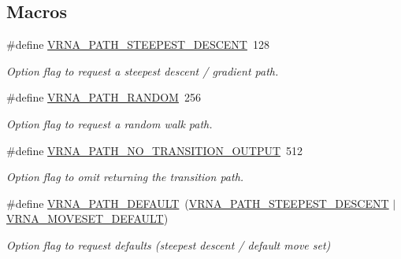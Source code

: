 \subsection*{Macros}
\begin{DoxyCompactItemize}
\item 
\#define \hyperlink{group__paths_ga705cea2b3243a38a2d6e3b1e141ed061}{V\+R\+N\+A\+\_\+\+P\+A\+T\+H\+\_\+\+S\+T\+E\+E\+P\+E\+S\+T\+\_\+\+D\+E\+S\+C\+E\+NT}~128
\begin{DoxyCompactList}\small\item\em Option flag to request a steepest descent / gradient path. \end{DoxyCompactList}\item 
\#define \hyperlink{group__paths_ga0b84bd36bfd783130297797c51dd85ae}{V\+R\+N\+A\+\_\+\+P\+A\+T\+H\+\_\+\+R\+A\+N\+D\+OM}~256
\begin{DoxyCompactList}\small\item\em Option flag to request a random walk path. \end{DoxyCompactList}\item 
\#define \hyperlink{group__paths_ga1ee63e54ecf136491e12ff03ede2622d}{V\+R\+N\+A\+\_\+\+P\+A\+T\+H\+\_\+\+N\+O\+\_\+\+T\+R\+A\+N\+S\+I\+T\+I\+O\+N\+\_\+\+O\+U\+T\+P\+UT}~512
\begin{DoxyCompactList}\small\item\em Option flag to omit returning the transition path. \end{DoxyCompactList}\item 
\#define \hyperlink{group__paths_gaf1bb1f8fec8d24e3b821f621b19f77b4}{V\+R\+N\+A\+\_\+\+P\+A\+T\+H\+\_\+\+D\+E\+F\+A\+U\+LT}~(\hyperlink{group__paths_ga705cea2b3243a38a2d6e3b1e141ed061}{V\+R\+N\+A\+\_\+\+P\+A\+T\+H\+\_\+\+S\+T\+E\+E\+P\+E\+S\+T\+\_\+\+D\+E\+S\+C\+E\+NT} $\vert$ \hyperlink{group__neighbors_gaa5ffec4dd0d02df320f123e6888154d1}{V\+R\+N\+A\+\_\+\+M\+O\+V\+E\+S\+E\+T\+\_\+\+D\+E\+F\+A\+U\+LT})
\begin{DoxyCompactList}\small\item\em Option flag to request defaults (steepest descent / default move set) \end{DoxyCompactList}\end{DoxyCompactItemize}
